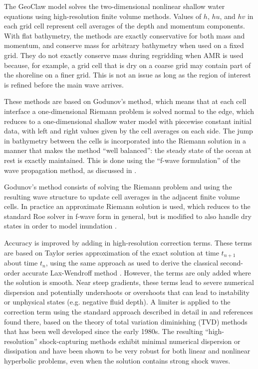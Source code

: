 \documentclass[11pt]{article}
\begin{document}
The GeoClaw model solves the two-dimensional nonlinear shallow water equations 
using high-resolution finite volume methods.  Values of $h$, $hu$, and $hv$
in each grid cell represent cell averages of the depth and momentum
components.  With flat bathymetry, the methods are exactly conservative for
both mass and momentum, and conserve mass for arbitrary bathymetry when used
on a fixed grid. They do not exactly conserve mass during regridding when
AMR is used because, for example, a grid cell that is dry on a coarse grid
may contain part of the shoreline on a finer grid.  This is not an issue as
long as the region of interest is refined before the main wave arrives.


These methods are based on Godunov's method, which means that at each cell
interface a one-dimensional Riemann problem is solved normal to the edge,
which reduces to a one-dimensional shallow water model with piecewise
constant initial data,
with left and right values given by the cell averages on each side.
The jump in bathymetry between the cells is incorporated into the Riemann
solution in a manner that makes the method ``well balanced'': the steady
state of the ocean at rest is exactly maintained.  This is done using the
``f-wave formulation'' of the wave propagation method, as discussed in
\cite{BaleLeVequeEtAl2002,George2008,rjl:fvmhp,rjl:wbfwave10}.


Godunov's method consists of solving the Riemann problem and using the
resulting wave structure to update cell averages in the adjacent finite
volume cells.  In practice an approximate Riemann solution is used, which
reduces to the standard Roe solver \cite{rjl:fvmhp,roe:rs}
in f-wave form in general, but is modified
to also handle dry states in order to model inundation \cite{George2008}.

Accuracy is improved by adding in high-resolution correction terms.  These
terms are based on Taylor series approximation of the exact solution at time
$t_{n+1}$ about time $t_n$, using the same approach as used to derive the
classical second-order accurate Lax-Wendroff  method \cite{rjl:fdm}.
However, the terms are only added where the solution is smooth.  Near steep
gradients, these terms lead to severe numerical dispersion and potentially
undershoots or overshoots that can lead to instability or unphysical states
(e.g. negative fluid depth).  A limiter is applied to the correction term
using the standard approach described in detail in 
\cite{rjl:fvmhp} and references found there, based on the theory of total
variation diminishing (TVD) methods that has been well developed since the
early 1980s.  The resulting ``high-resolution'' shock-capturing 
methods exhibit minimal numerical dispersion or dissipation and have been
shown to be very robust for both linear and nonlinear hyperbolic problems, 
even when the solution contains strong shock waves.
\end{document}
